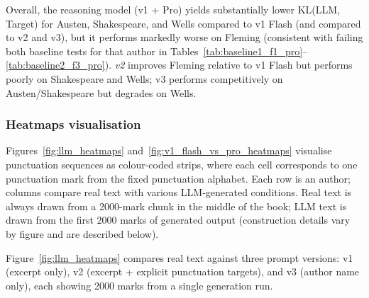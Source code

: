 \documentclass{article}
\begin{document}
Overall, the reasoning model (v1 + Pro) yields substantially lower KL(LLM, Target) for Austen, Shakespeare, and Wells compared to v1 Flash (and compared to v2 and v3), but it performs markedly worse on Fleming (consistent with failing both baseline tests for that author in Tables~\ref{tab:baseline1_f1_pro}--\ref{tab:baseline2_f3_pro}). \textit{v2} improves Fleming relative to v1 Flash but performs poorly on Shakespeare and Wells; v3 performs competitively on Austen/Shakespeare but degrades on Wells.

\subsubsection{Heatmaps visualisation}
\label{subsec:heatmaps}

Figures~\ref{fig:llm_heatmaps} and~\ref{fig:v1_flash_vs_pro_heatmaps} visualise punctuation sequences as colour-coded strips, where each cell corresponds to one punctuation mark from the fixed punctuation alphabet. Each row is an author; columns compare real text with various LLM-generated conditions. Real text is always drawn from a 2000-mark chunk in the middle of the book; LLM text is drawn from the first 2000 marks of generated output (construction details vary by figure and are described below).

Figure~\ref{fig:llm_heatmaps} compares real text against three prompt versions: v1 (excerpt only), v2 (excerpt + explicit punctuation targets), and v3 (author name only), each showing 2000 marks from a single generation run.
\end{document}
